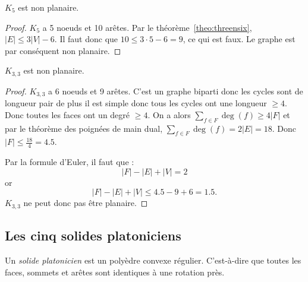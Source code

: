 \begin{mycorr}
  $K_5$ est non planaire.
  \begin{proof}
    $K_5$ a 5 noeuds et 10 arêtes.
    Par le théorème~\ref{theo:threensix}, $|E| \leq 3|V| - 6$.
    Il faut donc que $10 \leq 3 \cdot 5 - 6 = 9$, ce qui est faux.
    Le graphe est par conséquent non planaire.
  \end{proof}
\end{mycorr}

\begin{mycorr}
  $K_{3,3}$ est non planaire.
  \begin{proof}
    $K_{3,3}$ a 6 noeuds et 9 arêtes.
    C'est un graphe biparti donc les cycles sont de longueur pair de plus il est simple donc tous les cycles ont une longueur $\geq 4$.
    Donc toutes les faces ont un degré $\geq 4$.
    On a alors $\sum_{f \in F} \deg(f) \geq 4|F|$ et par le théorème des poignées de main dual, $\sum_{f \in F} \deg(f) = 2|E| = 18$.
    Donc $|F| \leq \frac{18}{4} = 4.5$.

    Par la formule d'Euler, il faut que :
    $$|F| - |E| + |V| = 2$$
    or
    $$|F| - |E| + |V| \leq 4.5 - 9 + 6 = 1.5.$$
    $K_{3,3}$ ne peut donc pas être planaire.
  \end{proof}
\end{mycorr}

\subsection{Les cinq solides platoniciens}
\begin{mydef}
  Un \emph{solide platonicien} est un polyèdre convexe régulier.
  C'est-à-dire que toutes les faces, sommets et arêtes sont identiques à une rotation près.
\end{mydef}

